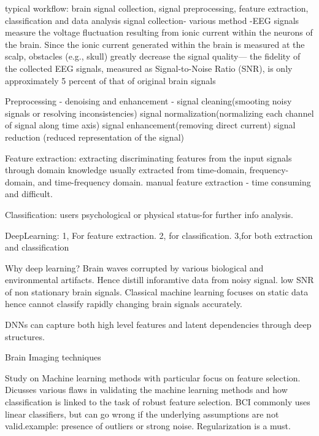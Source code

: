 \cite{Survey_DL_BCI_2020}
typical workflow: brain signal collection, signal preprocessing, feature extraction, classification and data analysis
signal collection- various method -EEG signals measure the voltage fluctuation resulting from ionic current within the neurons of the brain.
Since the ionic current generated within the brain is measured at the scalp, obstacles (e.g., skull) greatly decrease the signal quality—
the fidelity of the collected EEG signals, measured as Signal-to-Noise Ratio (SNR), is only approximately 5 percent of that of original brain signals

Preprocessing - denoising and enhancement - signal cleaning(smooting noisy signals or resolving inconsistencies)
signal normalization(normalizing each channel of signal along time axis)
signal enhancement(removing direct current)
signal reduction (reduced representation of the signal)

Feature extraction: extracting discriminating features from the input signals through domain knowledge
usually extracted from time-domain, frequency-domain, and time-frequency domain.
manual feature extraction - time consuming and difficult.

Classification: users psychological or physical status-for further info analysis.

DeepLearning: 1, For feature extraction. 2, for classification. 3,for both extraction and classification

Why deep learning?
Brain waves corrupted by various biological and environmental artifacts. Hence distill inforamtive data from noisy signal.
low SNR of non stationary brain signals. Classical machine learning focuses on static data  hence cannot classify rapidly changing brain signals accurately.

DNNs can capture both high level features and latent dependencies through deep structures.

Brain Imaging techniques


\cite{2004_EEG_ML}
Study on Machine learning methods with particular focus on feature selection. Dicusses various flaws in validating the machine learning methods and how classification is linked to the task of robust feature selection.
BCI commonly uses linear classifiers, but can go wrong if the underlying assumptions are not valid.example: presence of outliers or strong noise.
Regularization is a must.

